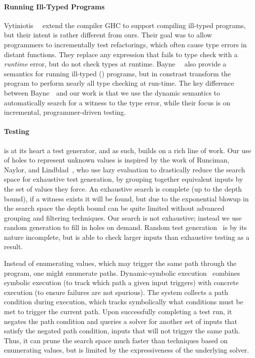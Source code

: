 \paragraph{Running Ill-Typed Programs}
\label{sec:running-ill-typed}
Vytiniotis~\etal~\citealt{Vytiniotis2012-gh} extend the \haskell
compiler GHC to support compiling ill-typed programs, but their intent
is rather different from ours. Their goal was to allow programmers to
incrementally test refactorings, which often cause type errors in
distant functions. They replace any expression that fails to type
check with a \emph{runtime} error, but do not check types
at runtime.
%
Bayne~\etal~\citealt{Bayne2011-cn} also provide a semantics for running
ill-typed (\java) programs, but in constrast transform the program to
perform nearly all type checking at run-time. The key difference between
Bayne~\etal\ and our work is that we use the dynamic semantics to
automatically search for a witness to the type error, while their focus
is on incremental, programmer-driven testing.

\paragraph{Testing}\label{sec:testing}
%
\nanomaly is at its heart a test generator, and as such,
builds on a rich line of work.
%
Our use of holes to represent unknown values is inspired by the work of
Runciman, Naylor, and Lindblad~\cite{Runciman2008-ka,Naylor2007-mi,Lindblad2007-oy},
%
who use lazy evaluation to drastically reduce the search space for
exhaustive test generation, by grouping together equivalent inputs by
the set of values they force. An exhaustive search is complete (up to
the depth bound), if a witness exists it will be found, but due to the
exponential blowup in the search space the depth bound can be quite
limited without advanced grouping and filtering techniques.
%
Our search is not exhaustive; instead we use random generation to fill
in holes on demand.
%
Random test generation~\cite{Claessen2000-lj,Csallner2004-bf,Pacheco2007-at}
%
is by its nature incomplete, but is able to check larger inputs than
exhaustive testing as a result.

Instead of enumerating values, which may trigger the same path through
the program, one might enumerate paths.
%
Dynamic-symbolic execution~\cite{Godefroid2005-am,Cadar2008-kg,Tillmann2008-qc}
%
combines symbolic execution (to track which path a given input triggers)
with concrete execution (to ensure failures are not spurious). The
system collects a path condition during execution, which tracks
symbolically what conditions must be met to trigger the current
path. Upon successfully completing a test run, it negates the path
condition and queries a solver for another set of inputs that satisfy
the negated path condition, \ie inputs that will not trigger the same
path. Thus, it can prune the search space much faster than techniques
based on enumerating values, but is limited by the expressiveness of the
underlying solver.

